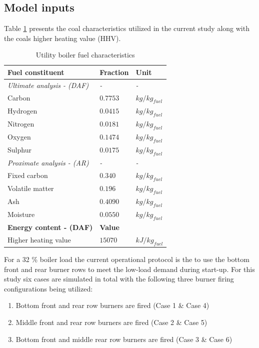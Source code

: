 \documentclass[review]{elsarticle}
\begin{document}
\subsection{Model inputs}
Table \ref{tbl_fuel} presents the coal characteristics utilized in the current study along with the coals higher heating value (HHV).\\
\begin{table}[h!]
\centering
\caption{Utility boiler fuel characteristics}
\vspace{2mm}
\label{tbl_fuel}
{\tabulinesep=1.2mm
\begin{tabularx}{\textwidth}{p{} p{} l}
\hline
\textbf{Fuel constituent} & \textbf{Fraction} & \textbf{Unit}\\
\hline
\textit{Ultimate analysis - (DAF)} & \textit{-} & \textit{-}\\
Carbon & $0.7753$ & $kg/kg_{fuel}$\\
Hydrogen & $0.0415$ & $kg/kg_{fuel}$\\
Nitrogen & $0.0181$ & $kg/kg_{fuel}$\\
Oxygen & $0.1474$ & $kg/kg_{fuel}$\\
Sulphur & $0.0175$ & $kg/kg_{fuel}$\\
\textit{Proximate analysis - (AR)} & \textit{-} & \textit{-}\\
Fixed carbon & $0.340$ & $kg/kg_{fuel}$\\
Volatile matter & $0.196$ & $kg/kg_{fuel}$\\
Ash & $0.4090$ & $kg/kg_{fuel}$\\
Moisture & $0.0550$ & $kg/kg_{fuel}$\\
\hline
\textbf{Energy content - (DAF)} & \textbf{Value} &\\
\hline
Higher heating value & $15070$ & $kJ/kg_{fuel}$\\
\hline
\end{tabularx}}
\end{table}

For a 32 \% boiler load the current operational protocol is the to use the bottom front and rear burner rows to meet the low-load demand during start-up.  For this study six cases are simulated in total with the following three burner firing configurations being utilized:
\begin{enumerate}
\item Bottom front and rear row burners are fired (Case 1 \& Case 4)
\item Middle front and rear row burners are fired (Case 2 \& Case 5)
\item Bottom front and middle rear row burners are fired (Case 3 \& Case 6)
\end{enumerate}
\end{document}
